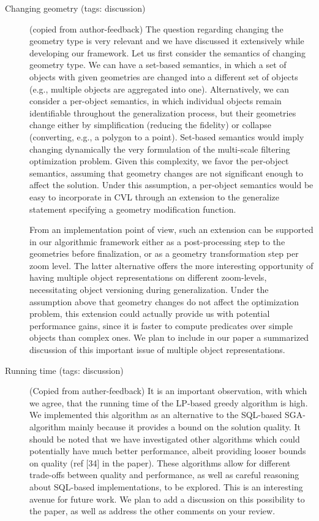 \documentclass[11pt, oneside]{article}   	%
\begin{document}
\begin{description}
\item[Changing geometry (tags: discussion)] (copied from author-feedback) The question regarding changing the geometry type is very relevant and we have discussed it extensively while developing our framework. Let us first consider the semantics of changing geometry type. We can have a set-based semantics, in which a set of objects with given geometries are changed into a different set of objects (e.g., multiple objects are aggregated into one). Alternatively, we can consider a per-object semantics, in which individual objects remain identifiable throughout the generalization process, but their geometries change either by simplification (reducing the fidelity) or collapse (converting, e.g., a polygon to a point). Set-based semantics would imply changing dynamically the very formulation of the multi-scale filtering optimization problem. Given this complexity, we favor the per-object semantics, assuming that geometry changes are not significant enough to affect the solution. Under this assumption, a per-object semantics would be easy to incorporate in CVL through an extension to the generalize statement specifying a geometry modification function.

From an implementation point of view, such an extension can be supported in our algorithmic framework either as a post-processing step to the geometries before finalization, or as a geometry transformation step per zoom level. The latter alternative offers the more interesting opportunity of having multiple object representations on different zoom-levels, necessitating object versioning during generalization. Under the assumption above that geometry changes do not affect the optimization problem, this extension could actually provide us with potential performance gains, since it is faster to compute predicates over simple objects than complex ones. We plan to include in our paper a summarized discussion of this important issue of multiple object representations.

\item[Running time (tags: discussion)] (Copied from auther-feedback) It is an important observation, with which we agree, that the running time of the LP-based greedy algorithm is high. We implemented this algorithm as an alternative to the SQL-based SGA-algorithm mainly because it provides a bound on the solution quality. It should be noted that we have investigated other algorithms which could potentially have much better performance, albeit providing looser bounds on quality (ref [34] in the paper). These algorithms allow for different trade-offs between quality and performance, as well as careful reasoning about SQL-based implementations, to be explored. This is an interesting avenue for future work. We plan to add a discussion on this possibility to the paper, as well as address the other comments on your review.
\end{description}
\end{document}
